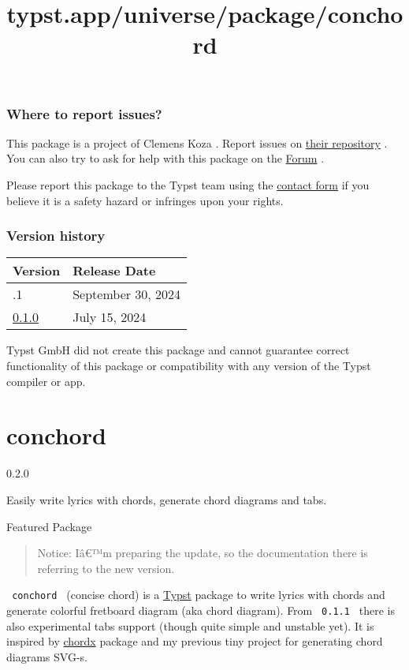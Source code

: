 \subsubsection{Where to report issues?}\label{where-to-report-issues}

This package is a project of Clemens Koza . Report issues on
\href{https://github.com/SillyFreak/typst-crudo}{their repository} . You
can also try to ask for help with this package on the
\href{https://forum.typst.app}{Forum} .

Please report this package to the Typst team using the
\href{https://typst.app/contact}{contact form} if you believe it is a
safety hazard or infringes upon your rights.

\label{versions}
\subsubsection{Version history}\label{version-history}

\begin{longtable}[]{@{}ll@{}}
\toprule\noalign{}
Version & Release Date \\
\midrule\noalign{}
\endhead
\bottomrule\noalign{}
\endlastfoot
0.1.1 & September 30, 2024 \\
\href{https://typst.app/universe/package/crudo/0.1.0/}{0.1.0} & July 15,
2024 \\
\end{longtable}

Typst GmbH did not create this package and cannot guarantee correct
functionality of this package or compatibility with any version of the
Typst compiler or app.


\title{typst.app/universe/package/conchord}

\label{banner}
\section{conchord}\label{conchord}

{ 0.2.0 }

Easily write lyrics with chords, generate chord diagrams and tabs.

{ } Featured Package

\label{readme}
\begin{quote}
Notice: Iâ€™m preparing the update, so the documentation there is
referring to the new version.
\end{quote}

\texttt{\ conchord\ } (concise chord) is a
\href{https://github.com/typst/typst}{Typst} package to write lyrics
with chords and generate colorful fretboard diagram (aka chord diagram).
From \texttt{\ 0.1.1\ } there is also experimental tabs support (though
quite simple and unstable yet). It is inspired by
\href{https://github.com/ljgago/typst-chords}{chordx} package and my
previous tiny project for generating chord diagrams SVG-s.

